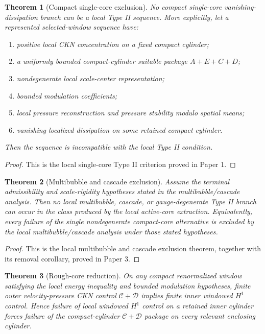 \documentclass[11pt]{amsart}
\theoremstyle{plain}
\newtheorem{theorem}{Theorem}[section]
\theoremstyle{definition}
\theoremstyle{remark}
\begin{document}
\begin{theorem}[Compact single-core exclusion]
\label{thm:single-core}
No compact single-core vanishing-dissipation branch can be a local Type II
sequence.  More explicitly, let a represented selected-window sequence have:
\begin{enumerate}[label=\textup{(\roman*)}]
\item positive local CKN concentration on a fixed compact cylinder;
\item a uniformly bounded compact-cylinder suitable package \(A+E+C+D\);
\item nondegenerate local scale-center representation;
\item bounded modulation coefficients;
\item local pressure reconstruction and pressure stability modulo spatial
means;
\item vanishing localized dissipation on some retained compact cylinder.
\end{enumerate}
Then the sequence is incompatible with the local Type II condition.
\end{theorem}

\begin{proof}
This is the local single-core Type II criterion proved in Paper 1.
\end{proof}

\begin{theorem}[Multibubble and cascade exclusion]
\label{thm:multibubble}
Assume the terminal admissibility and scale-rigidity hypotheses stated in the
multibubble/cascade analysis.
Then no local multibubble, cascade, or gauge-degenerate Type II branch can occur
in the class produced by the local active-core extraction.  Equivalently, every
failure of the single nondegenerate compact-core alternative is excluded by the
local multibubble/cascade analysis under those stated hypotheses.
\end{theorem}

\begin{proof}
This is the local multibubble and cascade exclusion theorem, together with its
removal corollary, proved in Paper 3.
\end{proof}

\begin{theorem}[Rough-core reduction]
\label{thm:rough-core}
On any compact renormalized window satisfying the local energy inequality and
bounded modulation hypotheses, finite outer velocity-pressure CKN control
\(\mathcal C+\mathcal D\) implies finite inner windowed \(H^1\) control.  Hence
failure of local windowed \(H^1\) control on a retained inner cylinder forces
failure of the compact-cylinder \(\mathcal C+\mathcal D\) package on every
relevant enclosing cylinder.
\end{theorem}
\end{document}
